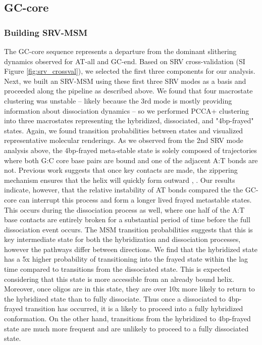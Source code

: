 \documentclass[journal=jpcbfk,manuscript=article]{achemso}
\begin{document}

\subsection{\label{sec:Results}GC-core}

\subsubsection{\label{sec:Results}Building SRV-MSM}

The GC-core sequence represents a departure from the dominant slithering dynamics observed for AT-all and GC-end. Based on SRV cross-validation (SI Figure \ref{fig:srv_crossval}), we selected the first three components for our analysis. Next, we built an SRV-MSM using these first three SRV modes as a basis and proceeded along the pipeline as described above. We found that four macrostate clustering was unstable -- likely because the 3rd mode is mostly providing  information about dissociation dynamics -- so we performed PCCA+ clustering into three macrostates representing the hybridized, dissociated, and "4bp-frayed" states. Again, we found transition probabilities between states and visualized representative molecular renderings. As we observed from the 2nd SRV mode analysis above, the 4bp-frayed meta-stable state is solely composed of trajectories where both G:C core base pairs are bound and one of the adjacent A:T bonds are not. Previous work suggests that once key contacts are made, the zippering mechanism ensures that the helix will quickly form outward \citep{Romano2013DNADependence}, \citep{Yin2011KineticsHybridization}. Our results indicate, however, that the relative instability of AT bonds compared the the GC-core can interrupt this process and form a longer lived frayed metastable states. This occurs during the dissociation process as well, where one half of the A:T base contacts are entirely broken for a substantial period of time before the full dissociation event occurs. The MSM transition probabilities suggests that this is key intermediate state for both the hybridization and dissociation processes, however the pathways differ between directions. We find that the hybridized state has a 5x higher probability of transitioning into the frayed state within the lag time compared to transitions from the dissociated state. This is expected considering that this state is more accessible from an already bound helix. Moreover, once oligos are in this state, they are over 10x more likely to return to the hybridized state than to fully dissociate. Thus once a dissociated to 4bp-frayed transition has occurred, it is a likely to proceed into a fully hybridized conformation. On the other hand, transitions from the hybridized to 4bp-frayed state are much more frequent and are unlikely to proceed to a fully dissociated state.
\end{document}
